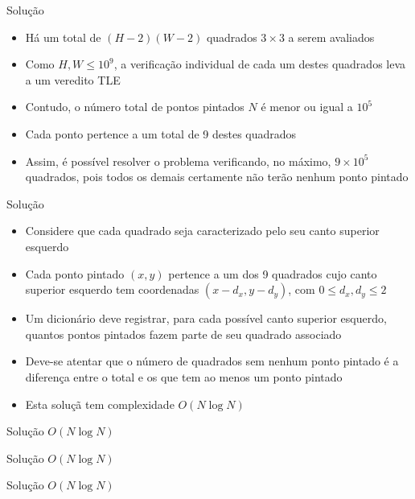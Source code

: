 \begin{frame}[fragile]{Solução}

    \begin{itemize}
        \item Há um total de $(H - 2)(W - 2)$ quadrados $3\times 3$ a serem avaliados

        \item Como $H, W\leq 10^9$, a verificação individual de cada um destes quadrados leva a
            um veredito TLE

        \item Contudo, o número total de pontos pintados $N$ é menor ou igual a $10^5$

        \item Cada ponto pertence a um total de 9 destes quadrados

        \item Assim, é possível resolver o problema verificando, no máximo, $9\times 10^5$
            quadrados, pois todos os demais certamente não terão nenhum ponto pintado

    \end{itemize}

\end{frame}


\begin{frame}[fragile]{Solução}

    \begin{itemize}
        \item Considere que cada quadrado seja caracterizado pelo seu canto superior esquerdo

        \item Cada ponto pintado $(x, y)$ pertence a um dos 9 quadrados cujo canto superior
            esquerdo tem coordenadas $(x - d_x, y - d_y)$, com $0\leq d_x, d_y\leq 2$

        \item Um dicionário deve registrar, para cada possível canto superior esquerdo, quantos
            pontos pintados fazem parte de seu quadrado associado

        \item Deve-se atentar que o número de quadrados sem nenhum ponto pintado é a diferença
            entre o total e os que tem ao menos um ponto pintado

        \item Esta soluçã tem complexidade $O(N\log N)$
    \end{itemize}

\end{frame}

\begin{frame}[fragile]{Solução $O(N\log N)$}
\end{frame}

\begin{frame}[fragile]{Solução $O(N\log N)$}
\end{frame}

\begin{frame}[fragile]{Solução $O(N\log N)$}
\end{frame}
